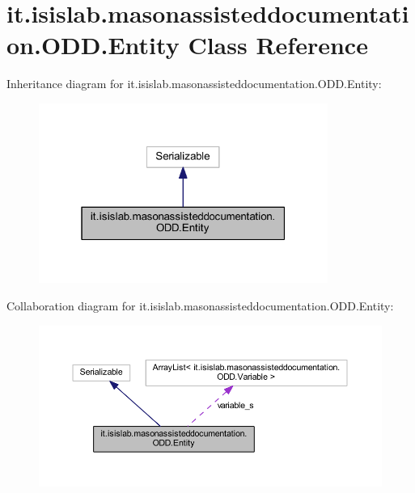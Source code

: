 \hypertarget{classit_1_1isislab_1_1masonassisteddocumentation_1_1_o_d_d_1_1_entity}{\section{it.\-isislab.\-masonassisteddocumentation.\-O\-D\-D.\-Entity Class Reference}
\label{classit_1_1isislab_1_1masonassisteddocumentation_1_1_o_d_d_1_1_entity}
}


Inheritance diagram for it.\-isislab.\-masonassisteddocumentation.\-O\-D\-D.\-Entity\-:
\nopagebreak
\begin{figure}[H]
\begin{center}
\leavevmode
\includegraphics[width=268pt]{classit_1_1isislab_1_1masonassisteddocumentation_1_1_o_d_d_1_1_entity__inherit__graph}
\end{center}
\end{figure}


Collaboration diagram for it.\-isislab.\-masonassisteddocumentation.\-O\-D\-D.\-Entity\-:
\nopagebreak
\begin{figure}[H]
\begin{center}
\leavevmode
\includegraphics[width=350pt]{classit_1_1isislab_1_1masonassisteddocumentation_1_1_o_d_d_1_1_entity__coll__graph}
\end{center}
\end{figure}
